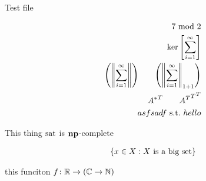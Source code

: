 \documentclass[12pt]{article}
\begin{document}
Test file

\begin{align*}
  {7\ \mathrm{mod}\ 2} \\
  {\mathrm{ker}\left[\sum_{i = 1}^\infty\right]} \\
  {\left({\left\lVert\sum_{i = 1}^\infty\right\rVert}\right)} \qquad
    {\left({\left\lVert\sum_{i = 1}^\infty\right\rVert}_{1 + 1}\right)} \\
  {{A^{\ast}}^{T}} \qquad {{{A^{T}}^{T}}^{T}} \\
  asfsadf {\ \mathrm{s.t.}\ } hello \\
\end{align*}

This thing ${\text{sat}}$ is ${\mathbf{np}}$-complete

\begin{align*}
  {\left\{ x \in X : \text{\text{$X$ is a big set}}\right\}}
\end{align*}

this funciton ${f \colon {\mathbb{R}} \to {\left({\mathbb{C}}\to {\mathbb{N}}\right)}}$
\end{document}

